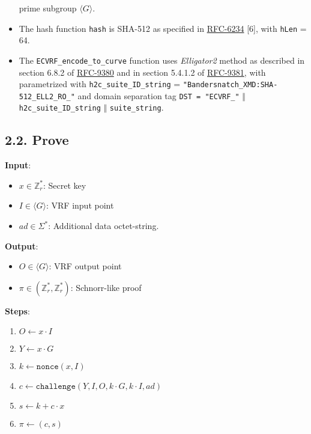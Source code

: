 \documentclass[
]{article}
\providecommand{\tightlist}{%
  \setlength{\itemsep}{0pt}\setlength{\parskip}{0pt}}
\begin{document}
\begin{itemize}
  prime subgroup \(\langle G \rangle\).
\item
  The hash function \texttt{hash} is SHA-512 as specified in
  \href{https://datatracker.ietf.org/doc/rfc6234}{RFC-6234} {[}6{]},
  with \texttt{hLen} = 64.
\item
  The \texttt{ECVRF\_encode\_to\_curve} function uses \emph{Elligator2}
  method as described in section 6.8.2 of
  \href{https://datatracker.ietf.org/doc/rfc9380}{RFC-9380} and in
  section 5.4.1.2 of
  \href{https://datatracker.ietf.org/doc/rfc9381}{RFC-9381}, with
  parametrized with \texttt{h2c\_suite\_ID\_string} =
  \texttt{"Bandersnatch\_XMD:SHA-512\_ELL2\_RO\_"} and domain separation
  tag \texttt{DST\ =\ "ECVRF\_"} \(\Vert\)
  \texttt{h2c\_suite\_ID\_string} \(\Vert\) \texttt{suite\_string}.
\end{itemize}

\hypertarget{prove}{%
\subsection{2.2. Prove}\label{prove}}

\textbf{Input}:

\begin{itemize}
\tightlist
\item
  \(x \in \mathbb{Z}^*_r\): Secret key
\item
  \(I \in \langle G \rangle\): VRF input point
\item
  \(ad \in \Sigma^*\): Additional data octet-string.
\end{itemize}

\textbf{Output}:

\begin{itemize}
\tightlist
\item
  \(O \in \langle G \rangle\): VRF output point
\item
  \(\pi \in (\mathbb{Z}^*_r, \mathbb{Z}^*_r)\): Schnorr-like proof
\end{itemize}

\textbf{Steps}:

\begin{enumerate}
\def\labelenumi{\arabic{enumi}.}
\tightlist
\item
  \(O \gets x \cdot I\)
\item
  \(Y \gets x \cdot G\)
\item
  \(k \gets \texttt{nonce}(x, I)\)
\item
  \(c \gets \texttt{challenge}(Y, I, O, k \cdot G, k \cdot I, ad)\)
\item
  \(s \gets k + c \cdot x\)
\item
  \(\pi \gets (c, s)\)
\end{enumerate}
\end{document}
